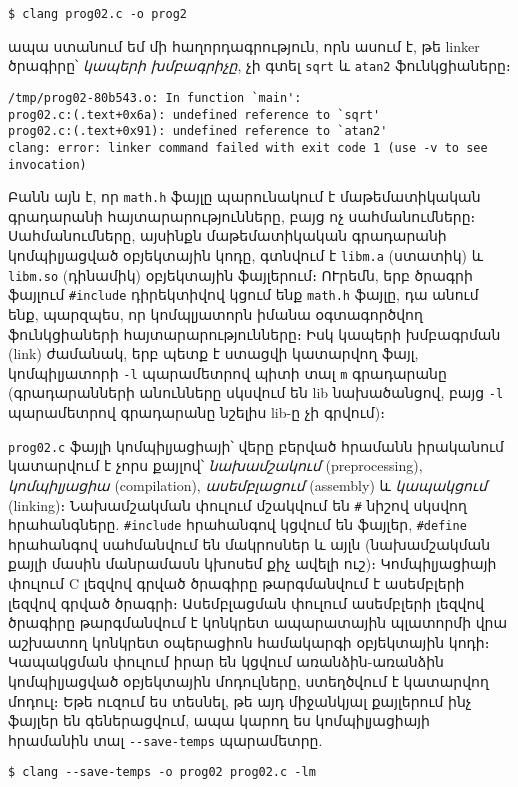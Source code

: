 \begin{verbatim}
$ clang prog02.c -o prog2
\end{verbatim}

ապա ստանում եմ մի հաղորդագրություն, որն ասում է, թե linker ծրագիրը՝
\emph{կապերի խմբագրիչը}, չի գտել \texttt{sqrt} և \texttt{atan2}
ֆունկցիաները։

\begin{verbatim}
/tmp/prog02-80b543.o: In function `main':
prog02.c:(.text+0x6a): undefined reference to `sqrt'
prog02.c:(.text+0x91): undefined reference to `atan2'
clang: error: linker command failed with exit code 1 (use -v to see invocation)
\end{verbatim}

Բանն այն է, որ \texttt{math.h} ֆայլը պարունակում է մաթեմատիկական
գրադարանի հայտարարությունները, բայց ոչ սահմանումները։ Սահմանումները,
այսինքն մաթեմատիկական գրադարանի կոմպիլյացված օբյեկտային կոդը, գտնվում է
\texttt{libm.a} (ստատիկ) և \texttt{libm.so} (դինամիկ) օբյեկտային
ֆայլերում։ ՈՒրեմն, երբ ծրագրի ֆայլում \texttt{\#include} դիրեկտիվով
կցում ենք \texttt{math.h} ֆայլը, դա անում ենք, պարզպես, որ կոմպլյատորն
իմանա օգտագործվող ֆունկցիաների հայտարարությունները։ Իսկ կապերի խմբագրման
(link) ժամանակ, երբ պետք է ստացվի կատարվող ֆայլ, կոմպիլյատորի
\texttt{-l} պարամետրով պիտի տալ \texttt{m} գրադարանը (գրադարանների
անունները սկսվում են lib նախածանցով, բայց \texttt{-l} պարամետրով
գրադարանը նշելիս lib-ը չի գրվում)։

\texttt{prog02.c} ֆայլի կոմպիլյացիայի՝ վերը բերված հրամանն իրականում
կատարվում է չորս քայլով՝ \emph{նախամշակում} (preprocessing),
\emph{կոմպիլյացիա} (compilation), \emph{ասեմբլացում} (assembly) և
\emph{կապակցում} (linking)։ Նախամշակման փուլում մշակվում են \texttt{\#}
նիշով սկսվող հրահանգները. \texttt{\#include} հրահանգով կցվում են ֆայլեր,
\texttt{\#define} հրահանգով սահմանվում են մակրոսներ և այլն (նախամշակման
քայլի մասին մանրամասն կխոսեմ քիչ ավելի ուշ)։ Կոմպիլյացիայի փուլում C
լեզվով գրված ծրագիրը թարգմանվում է ասեմբլերի լեզվով գրված ծրագրի։
Ասեմբլացման փուլում ասեմբլերի լեզվով ծրագիրը թարգմանվում է կոնկրետ
ապարատային պլատորմի վրա աշխատող կոնկրետ օպերացիոն համակարգի օբյեկտային
կոդի։ Կապակցման փուլում իրար են կցվում առանձին-առանձին կոմպիլյացված
օբյեկտային մոդուլները, ստեղծվում է կատարվող մոդուլ։ Եթե ուզում ես
տեսնել, թե այդ միջանկյալ քայլերում ինչ ֆայլեր են գեներացվում, ապա կարող
ես կոմպիլյացիայի հրամանին տալ \verb|--save-temps| պարամետրը.

\begin{verbatim}
$ clang --save-temps -o prog02 prog02.c -lm
\end{verbatim}

